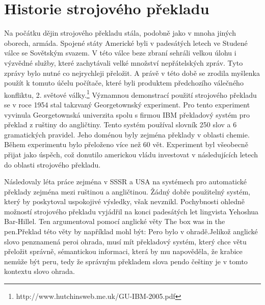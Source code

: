 \documentclass[12pt,a4paper]{report}
\begin{document}


\section{Historie strojového překladu}

Na počátku dějin strojového překladu stála, podobně jako v mnoha jiných oborech, armáda. Spojené státy Americké byli v padesátých letech ve Studené válce se Sovětským svazem. V této válce beze zbraní sehráli velkou úlohu i výzvědné služby, které zachytávali velké množství nepřátelských zpráv. Tyto zprávy bylo nutné co nejrychleji přeložit. A právě v této době se zrodila myšlenka použít k tomuto účelu počítače, které byli produktem předchozího válečného konfliktu, 2. světové války.\footnote{http://www.hutchinsweb.me.uk/GU-IBM-2005.pdf} Významnou demonstrací použití strojového překladu se v roce 1954 stal takzvaný Georgetownský experiment. Pro tento experiment vyvinula Georgetownská univerzita spolu s firmou IBM překladový systém pro překlad z ruštiny do angličtiny. Tento systém používal slovník 250 slov a 6 gramatických pravidel. Jeho doménou byly zejména překlady v oblasti chemie. Během experimentu bylo přeloženo více než 60 vět. Experiment byl všeobecně přijat jako úspěch, což donutilo americkou vládu investovat v následujících letech do oblasti strojového překladu.

Následovaly léta práce zejména v SSSR a USA na systémech pro automatické překlady zejména mezi ruštinou a angličtinou. Žádný dobře použitelný systém, který by poskytoval uspokojivé výsledky, však nevznikl. Pochybnosti ohledně možností strojového překladu vyjádřil na konci padesátých let lingvista Yehoshua Bar-Hillel. Ten argumentoval pomocí anglické věty \clqq The box was in the pen.\crqq  Překlad této věty by například  mohl být: \clqq Pero bylo v ohradě.\crqq  Jelikož anglické slovo \clqq pen\crqq  znamená \clqq pero\crqq  i \clqq ohrada\crqq , musí mít překladový systém, který chce větu přeložit správně, sémantickou informaci, která by mu napověděla, že krabice nemůže být peru, tedy že správným překladem slova \clqq pen\crqq  do češtiny je v tomto kontextu slovo \clqq ohrada\crqq .
\end{document}
